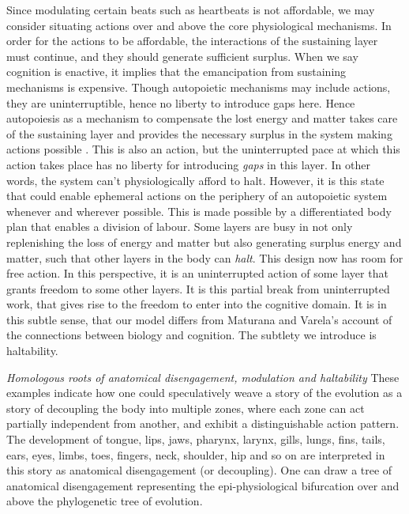  Since modulating certain beats such as heartbeats is not affordable, we may consider situating actions over and above the core physiological mechanisms. In order for the actions to be affordable, the interactions of the sustaining layer  must continue, and they should generate sufficient surplus. When we say cognition is enactive, it implies that the emancipation from sustaining mechanisms is expensive. Though autopoietic mechanisms may include actions, they are uninterruptible, hence no liberty to introduce gaps here. Hence autopoiesis as a mechanism to compensate the lost energy and matter takes care of the sustaining layer and provides the necessary surplus in the system making actions possible \cite{maturana1991autopoiesis}. This is also an action, but the uninterrupted pace at which this action takes place has no liberty for introducing \textit{gaps} in this layer. In other words, the system can't physiologically afford to halt. However, it is this state that could enable ephemeral actions on the periphery of an autopoietic system whenever and wherever possible. This is made possible by a differentiated body plan that enables a division of labour. Some layers are busy in not only replenishing the loss of energy and matter but also generating surplus energy and matter, such that other layers in the body can \textit{halt}. This design now has room for free action. In this perspective, it is an uninterrupted action of some layer that grants freedom to some other layers. It is this partial break from uninterrupted work, that gives rise to the freedom to enter into the cognitive domain. It is in this subtle sense, that our model differs from Maturana and Varela's account of the connections between biology and cognition. The subtlety we introduce is haltability. 

\emph{Homologous roots of anatomical disengagement, modulation and haltability} These examples indicate how one could speculatively weave a story of the evolution as a story of decoupling the body into multiple zones, where each zone can act partially independent from another, and exhibit a distinguishable action pattern. The development of tongue, lips, jaws, pharynx, larynx, gills, lungs, fins, tails, ears, eyes, limbs, toes, fingers, neck, shoulder, hip and so on are interpreted in this story as anatomical disengagement (or decoupling). One can draw a tree of anatomical disengagement representing the epi-physiological bifurcation over and above the phylogenetic tree of evolution. 

